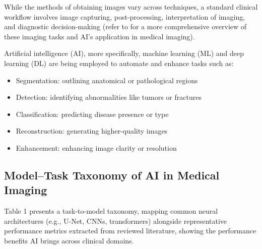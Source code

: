 \documentclass{article}
\begin{document}
While the methods of obtaining images vary across techniques, a standard clinical workflow involves image capturing, post-processing, interpretation of imaging, and diagnostic decision-making (refer to \cite{panayides_2020_ai} for a more comprehensive overview of these imaging tasks and AI's application in medical imaging).

Artificial intelligence (AI), more specifically, machine learning (ML) and deep learning (DL) are being employed to automate and enhance tasks such as:

\begin{itemize}
\item Segmentation: outlining anatomical or pathological regions
\item Detection: identifying abnormalities like tumors or fractures
\item Classification: predicting disease presence or type
\item Reconstruction: generating higher-quality images
\item Enhancement: enhancing image clarity or resolution
\end{itemize}

\subsection{Model–Task Taxonomy of AI in Medical Imaging}
Table 1 presents a task-to-model taxonomy, mapping common neural architectures (e.g., U-Net, CNNs, transformers) alongside representative performance metrics extracted from reviewed literature, showing the performance benefits AI brings across clinical domains. 


\renewcommand{\arraystretch}{1.5} %
\end{document}
